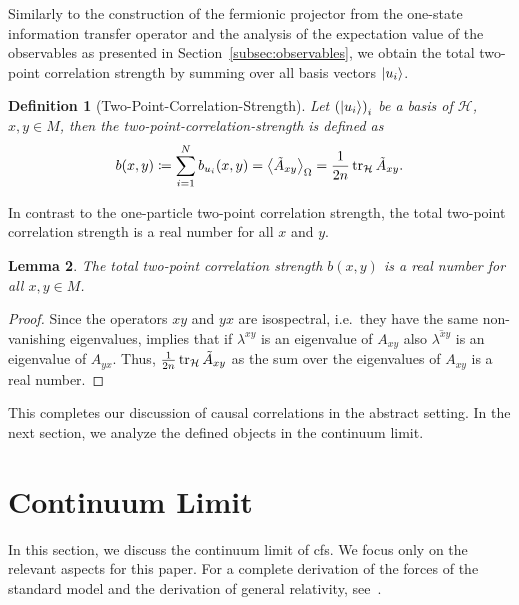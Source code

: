 \documentclass[reqno,11pt]{amsart}
\newcommand{\defeq}{\coloneqq}
\newcommand{\complexconj}[1]{\overline{#1}}
\renewcommand{\H}{\mathcal{H}}
\newtheorem{definition}{Definition}[section]
\newtheorem{lemma}[definition]{Lemma}
\numberwithin{equation}{section}
\begin{document}
Similarly to the construction of the fermionic projector from the one-state information transfer operator and the analysis
of the expectation value of the observables as presented in Section~\ref{subsec:observables}, we obtain the total
two-point correlation strength by summing over all basis vectors $\ket{u_i}$.

\begin{definition}[Two-Point-Correlation-Strength]
    Let $\left( \ket{u_i} \right)_i$ be a basis of $\H$, $x, y \in M$, then the \textit{two-point-correlation-strength}
    is defined as
    \begin{align}
        b(x, y) \defeq \sum_{i = 1}^N b_{u_i}(x, y) = \expval{\tilde{A}_{xy}}_\Omega = \frac{1}{2n} \tr_\H {\tilde{A}_{xy}}.
    \end{align}
\end{definition}

In contrast to the one-particle two-point correlation strength, the total two-point correlation strength is a real number for all
$x$ and $y$.

\begin{lemma}
    The total two-point correlation strength $b(x, y)$ is a real number for all $x, y \in M$.
\end{lemma}
\begin{proof}
    Since the operators $xy$ and $yx$ are isospectral, i.e.~they have the same non-vanishing eigenvalues, implies that
    if $\lambda^{xy}$ is an eigenvalue of $A_{xy}$ also $\complexconj{\lambda^{xy}}$ is an eigenvalue of $A_{yx}$.
    Thus, $\frac{1}{2n} \tr_{\H} {\tilde{A}_{xy}}$ as the sum over the eigenvalues of $A_{xy}$ is a real number.
\end{proof}

This completes our discussion of causal correlations in the abstract setting.
In the next section, we analyze the defined objects in the continuum limit.

    

\section{Continuum Limit}\label{sec:continuum-limit}

In this section, we discuss the continuum limit of \ac{cfs}.
We focus only on the relevant aspects for this paper.
For a complete derivation of the forces of the standard model and the derivation of general relativity, see~\cite{cfs}.
\end{document}
